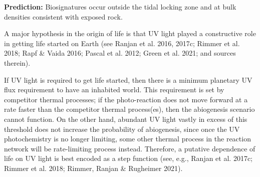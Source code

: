 \documentclass[modern,linenumbers]{aastex631}
\begin{document}
\textbf{Prediction:} Biosignatures occur outside the tidal locking zone and at bulk densities consistent with exposed rock.


A major hypothesis in the origin of life is that UV light played a constructive role in getting life started on Earth (see Ranjan et al. 2016, 2017c; Rimmer et al. 2018; Rapf \& Vaida 2016; Pascal et al. 2012; Green et al. 2021; and sources therein).

If UV light is required to get life started, then there is a minimum planetary UV flux requirement to have an inhabited world.
This requirement is set by competitor thermal processes; if the photo-reaction does not move forward at a rate faster than the competitor thermal process(es), then the abiogenesis scenario cannot function.
On the other hand, abundant UV light vastly in excess of this threshold does not increase the probability of abiogenesis, since once the UV photochemistry is no longer limiting, some other thermal process in the reaction network will be rate-limiting process instead.
Therefore, a putative dependence of life on UV light is best encoded as a step function (see, e.g., Ranjan et al. 2017c; Rimmer et al. 2018; Rimmer, Ranjan \& Rugheimer 2021).
\end{document}
